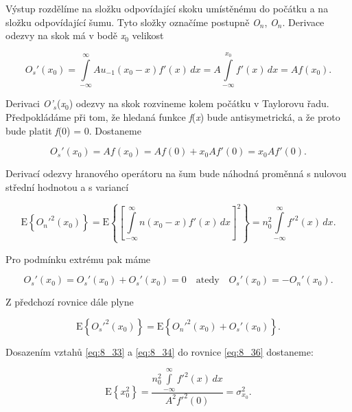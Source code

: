 Výstup rozdělíme na složku odpovídající skoku umístěnému do počátku a na složku odpovídající šumu. Tyto složky označíme postupně \textit{O}$_n$, \textit{O}$_n$. Derivace odezvy na skok má v bodě \textit{x}$_0$ velikost

\begin{equation} \label{eq:8_32}
    O_s'(x_0) = \int\limits_{-\infty}^{\infty} Au_{-1}(x_0 - x) f'(x)\,dx = A \int\limits_{-\infty}^{x_0} f'(x)\,dx = A f(x_0).
\end{equation}

Derivaci \textit{O'}$_s$(\textit{x}$_0$) odezvy na skok rozvineme kolem počátku v Taylorovu řadu. Předpokládáme při tom, že hledaná funkce \textit{f}(\textit{x}) bude antisymetrická, a že proto bude platit \textit{f}(0) = 0. Dostaneme

\begin{equation} \label{eq:8_33}
    O_s'(x_0) = Af(x_0) = Af(0) + x_0 Af'(0) = x_0Af'(0).
\end{equation}

Derivací odezvy hranového operátoru na šum bude náhodná proměnná s nulovou střední hodnotou a s variancí

\begin{equation} \label{eq:8_34}
    \mathrm{E} \left\{ O_n'^2(x_0) \right\} = \mathrm{E} \left\{ \left[ \int\limits_{-\infty}^{\infty} n(x_0 - x) f'(x)\,dx \right]^2 \right\} = n_0^2 \int\limits_{-\infty}^{\infty} f'^2(x)\,dx.
\end{equation}

Pro podmínku extrému pak máme

\begin{equation} \label{eq:8_35}
    O_s'(x_0) = O_s'(x_0) + O_s'(x_0) = 0 \quad \mathrm{a tedy} \quad O_s'(x_0) = -O_n'(x_0).
\end{equation}

Z předchozí rovnice dále plyne

\begin{equation} \label{eq:8_36}
    \mathrm{E} \left\{ O_s'^2(x_0) \right\} = \mathrm{E} \left\{ O_n'^2(x_0) + O_s'(x_0) \right\}.
\end{equation}

Dosazením vztahů \eqref{eq:8_33} a \eqref{eq:8_34} do rovnice \eqref{eq:8_36} dostaneme:

\begin{equation} \label{eq:8_37}
    \mathrm{E} \left\{ x_0^2 \right\} = \frac{n_0^2 \int\limits_{-\infty}^{\infty} f'^2(x)\,dx}{A^2 f'^2(0)} = \sigma_{x_0}^2.
\end{equation}

